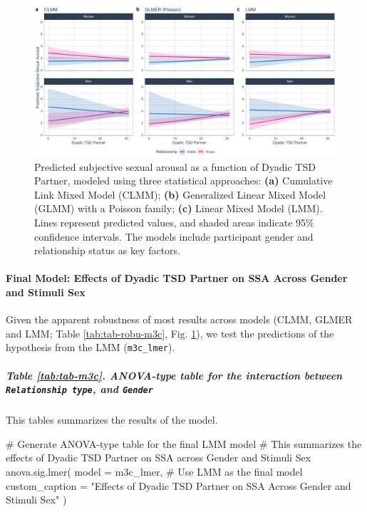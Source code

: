 \documentclass[
  bookmarksnumbered]{article}
\newenvironment{Shaded}{\begin{snugshade}}{\end{snugshade}}
\newcommand{\AttributeTok}[1]{\textcolor[rgb]{0.80,0.80,0.80}{#1}}
\newcommand{\CommentTok}[1]{\textcolor[rgb]{0.50,0.62,0.50}{#1}}
\newcommand{\FunctionTok}[1]{\textcolor[rgb]{0.94,0.94,0.56}{#1}}
\newcommand{\NormalTok}[1]{\textcolor[rgb]{0.80,0.80,0.80}{#1}}
\newcommand{\StringTok}[1]{\textcolor[rgb]{0.80,0.58,0.58}{#1}}
\begin{document}
\begin{figure}
\centering
\includegraphics{Sexual_Desire_Arousal_anonymous_files/figure-latex/preds-m3c-1.pdf}
\caption{\label{fig:preds-m3c}Predicted subjective sexual arousal as a function of Dyadic TSD Partner, modeled using three statistical approaches: \textbf{(a)} Cumulative Link Mixed Model (CLMM); \textbf{(b)} Generalized Linear Mixed Model (GLMM) with a Poisson family; \textbf{(c)} Linear Mixed Model (LMM). Lines represent predicted values, and shaded areas indicate 95\% confidence intervals. The models include participant gender and relationship status as key factors.}
\end{figure}

\paragraph{Final Model: Effects of Dyadic TSD Partner on SSA Across Gender and Stimuli Sex}\label{final-model-effects-of-dyadic-tsd-partner-on-ssa-across-gender-and-stimuli-sex-1}

Given the apparent robustness of most results across models (CLMM, GLMER and LMM; Table \ref{tab:tab-robu-m3c}, Fig. \ref{fig:preds-m3c}), we test the predictions of the hypothesis from the LMM (\texttt{m3c\_lmer}).

\subparagraph{\texorpdfstring{Table \ref{tab:tab-m3c}. ANOVA-type table for the interaction between \texttt{Relationship\ type}, and \texttt{Gender}}{Table \ref{tab:tab-m3c}. ANOVA-type table for the interaction between Relationship type, and Gender}}\label{table-reftabtab-m3c.-anova-type-table-for-the-interaction-between-relationship-type-and-gender}

This tables summarizes the results of the model.

\begin{Shaded}
\begin{Highlighting}[]
\CommentTok{\# Generate ANOVA{-}type table for the final LMM model}
\CommentTok{\# This summarizes the effects of Dyadic TSD Partner on SSA across Gender and Stimuli Sex}
\FunctionTok{anova.sig.lmer}\NormalTok{(}
  \AttributeTok{model =}\NormalTok{ m3c\_lmer, }\CommentTok{\# Use LMM as the final model}
  \AttributeTok{custom\_caption =} \StringTok{"Effects of Dyadic TSD Partner on SSA Across Gender and Stimuli Sex"}
\NormalTok{)}
\end{Highlighting}
\end{Shaded}
\end{document}
